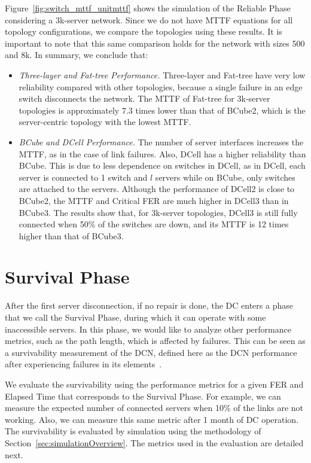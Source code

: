 Figure~\ref{fig:switch_mttf_unitmttf} shows the simulation of the Reliable Phase considering a 3k-server network. Since we do not have MTTF equations for all topology configurations, we compare the topologies using these results. It is important to note that this same comparison holds for the network with sizes 500 and 8k. In summary, we conclude that:
\begin{itemize}
\item \textit{Three-layer and Fat-tree Performance.} Three-layer and Fat-tree have very low reliability compared with other topologies, because a single failure in an edge switch disconnects the network. The MTTF of Fat-tree for 3k-server topologies is approximately $7.3$ times lower than that of BCube2, which is the server-centric topology with the lowest MTTF.
\item \textit{BCube and DCell Performance.} The number of server interfaces increases the MTTF, as in the case of link failures. Also, DCell has a higher reliability than BCube. This is due to less dependence on switches in DCell, as in DCell, each server is connected to 1 switch and $l$ servers while on BCube, only switches are attached to the servers. Although the performance of DCell2 is close to BCube2, the MTTF and Critical FER are much higher in DCell3 than in BCube3. The results show that, for 3k-server topologies, DCell3 is still fully connected when 50\% of the switches are down, and its MTTF is 12 times higher than that of BCube3.
\end{itemize}

\section{Survival Phase}
\label{sec:survival} 

After the first server disconnection, if no repair is done, the DC enters a phase that we call the Survival Phase, during which it can operate with some inaccessible servers. In this phase, we would like to analyze other performance metrics, such as the path length, which is affected by failures. This can be seen as a survivability measurement of the DCN, defined here as the DCN performance after experiencing failures in its elements~\cite{liew1994framework}.

We evaluate the survivability using the performance metrics for a given FER and Elapsed Time that corresponds to the Survival Phase. For example, we can measure the expected number of connected servers when 10\% of the links are not working. Also, we can measure this same metric after 1 month of DC operation. The survivability is evaluated by simulation using the methodology of Section~\ref{sec:simulationOverview}. The metrics used in the evaluation are detailed next.
